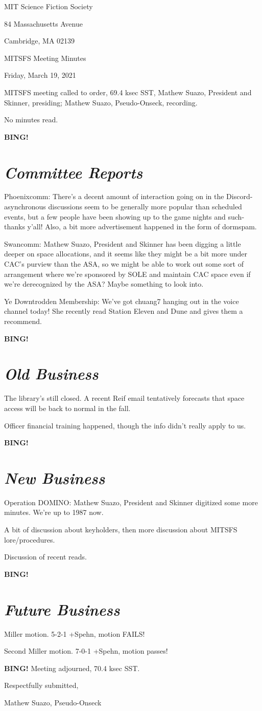 \documentclass[10pt]{article}
\newcommand{\bing}{{\bf BING!} }
\newcommand{\goto}[1]{\bing \vskip 12pt \section*{{\em{#1}}}}
\newcommand{\skinner}{Mathew Suazo, President and Skinner\xspace}
\newcommand{\onseck}{Mathew Suazo, Pseudo-Onseck\xspace}
\newcommand{\meetingdate}{Friday, March 19, 2021}
\begin{document}
\begin{center}

MIT Science Fiction Society

84 Massachusetts Avenue

Cambridge, MA 02139

\vspace{12pt}

MITSFS Meeting Minutes

\meetingdate

\end{center}

\vspace{18pt}

\setlength{\parskip}{6pt}

\noindent
MITSFS meeting called to order, 69.4 ksec SST,
\skinner, presiding; \onseck, recording.

No minutes read.

\goto{Committee Reports}

Phoenixcomm: There's a decent amount of interaction going on in the Discord- asynchronous discussions seem to be generally more popular than scheduled events, but a few people have been showing up to the game nights and such- thanks y'all! Also, a bit more advertisement happened in the form of dormspam.

Swancomm: \skinner has been digging a little deeper on space allocations, and it seems like they might be a bit more under CAC's purview than the ASA, so we might be able to work out some sort of arrangement where we're sponsored by SOLE and maintain CAC space even if we're derecognized by the ASA? Maybe something to look into.

Ye Downtrodden Membership: We've got chuang7 hanging out in the voice channel today! She recently read Station Eleven and Dune and gives them a recommend.

\goto{Old Business}

The library's still closed. A recent Reif email tentatively forecasts that space access will be back to normal in the fall.

Officer financial training happened, though the info didn't really apply to us.

\goto{New Business}

Operation DOMINO: \skinner digitized some more minutes. We're up to 1987 now.

A bit of discussion about keyholders, then more discussion about MITSFS lore/procedures.

Discussion of recent reads.

\goto{Future Business}

Miller motion. 5-2-1 +Spehn, motion FAILS!

Second Miller motion. 7-0-1 +Spehn, motion passes!

\bing
\noindent
Meeting adjourned, 70.4 ksec SST.

\vspace{18pt}

\centerline{Respectfully submitted,}
\centerline{\onseck}
\end{document}
